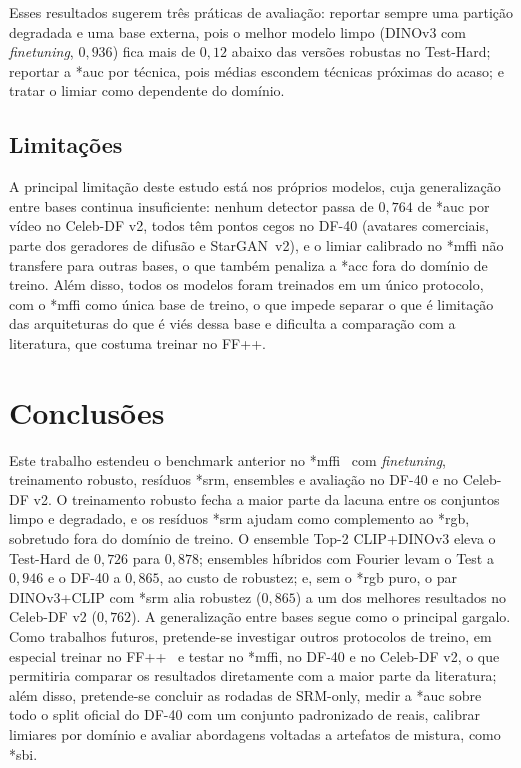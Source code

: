 \documentclass[10pt,conference]{IEEEtran}
\makeatletter
\newcommand{\acr@use}[2]{%
  \@ifundefined{acr@short@#1}{\textbf{??#1??}}{%
    \@ifundefined{acr@used@#1}{%
      \ifnum#2=0 \csname acr@long@#1\endcsname\else\csname acr@longpl@#1\endcsname\fi
      ~(\csname acr@short@#1\endcsname\ifnum#2=1 s\fi)%
      \expandafter\gdef\csname acr@used@#1\endcsname{}%
    }{%
      \csname acr@short@#1\endcsname\ifnum#2=1 s\fi
    }}%
}
\DeclareRobustCommand{\gls}{\@ifstar{\acr@use@s}{\acr@use@s}}
\newcommand{\acr@use@s}[1]{\acr@use{#1}{0}}
\makeatother
\begin{document}
Esses resultados sugerem três práticas de avaliação: reportar sempre uma partição degradada e uma base externa, pois o melhor modelo limpo (DINOv3 com \textit{finetuning}, $0{,}936$) fica mais de $0{,}12$ abaixo das versões robustas no Test-Hard; reportar a \gls*{auc} por técnica, pois médias escondem técnicas próximas do acaso; e tratar o limiar como dependente do domínio.

\subsection{Limitações}
\label{sec:limitations}

A principal limitação deste estudo está nos próprios modelos, cuja generalização entre bases continua insuficiente: nenhum detector passa de $0{,}764$ de \gls*{auc} por vídeo no Celeb-DF v2, todos têm pontos cegos no DF-40 (avatares comerciais, parte dos geradores de difusão e StarGAN~v2), e o limiar calibrado no \gls*{mffi} não transfere para outras bases, o que também penaliza a \gls*{acc} fora do domínio de treino.
Além disso, todos os modelos foram treinados em um único protocolo, com o \gls*{mffi} como única base de treino, o que impede separar o que é limitação das arquiteturas do que é viés dessa base e dificulta a comparação com a literatura, que costuma treinar no FF++.

\section{Conclusões}
\label{sec:conclusions}

Este trabalho estendeu o benchmark anterior no \gls*{mffi}~\cite{cunha2026benchmarking} com \textit{finetuning}, treinamento robusto, resíduos \gls*{srm}, ensembles e avaliação no DF-40 e no Celeb-DF v2.
O treinamento robusto fecha a maior parte da lacuna entre os conjuntos limpo e degradado, e os resíduos \gls*{srm} ajudam como complemento ao \gls*{rgb}, sobretudo fora do domínio de treino.
O ensemble Top-2 CLIP+DINOv3 eleva o Test-Hard de $0{,}726$ para $0{,}878$; ensembles híbridos com Fourier levam o Test a $0{,}946$ e o DF-40 a $0{,}865$, ao custo de robustez; e, sem o \gls*{rgb} puro, o par DINOv3+CLIP com \gls*{srm} alia robustez ($0{,}865$) a um dos melhores resultados no Celeb-DF v2 ($0{,}762$).
A generalização entre bases segue como o principal gargalo.
Como trabalhos futuros, pretende-se investigar outros protocolos de treino, em especial treinar no FF++~\cite{ref_faceforensics} e testar no \gls*{mffi}, no DF-40 e no Celeb-DF v2, o que permitiria comparar os resultados diretamente com a maior parte da literatura; além disso, pretende-se concluir as rodadas de SRM-only, medir a \gls*{auc} sobre todo o split oficial do DF-40 com um conjunto padronizado de reais, calibrar limiares por domínio e avaliar abordagens voltadas a artefatos de mistura, como \gls*{sbi}.
\end{document}
